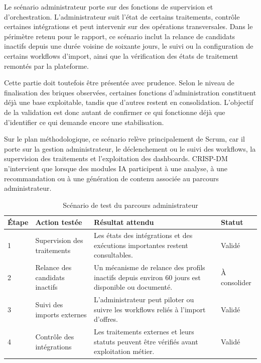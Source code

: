 Le scénario administrateur porte sur des fonctions de supervision et d'orchestration. L'administrateur suit l'état de certains traitements, contrôle certaines intégrations et peut intervenir sur des opérations transversales. Dans le périmètre retenu pour le rapport, ce scénario inclut la relance de candidats inactifs depuis une durée voisine de soixante jours, le suivi ou la configuration de certains workflows d'import, ainsi que la vérification des états de traitement remontés par la plateforme.

Cette partie doit toutefois être présentée avec prudence. Selon le niveau de finalisation des briques observées, certaines fonctions d'administration constituent déjà une base exploitable, tandis que d'autres restent en consolidation. L'objectif de la validation est donc autant de confirmer ce qui fonctionne déjà que d'identifier ce qui demande encore une stabilisation.

Sur le plan méthodologique, ce scénario relève principalement de Scrum, car il porte sur la gestion administrateur, le déclenchement ou le suivi des workflows, la supervision des traitements et l'exploitation des dashboards. CRISP-DM n'intervient que lorsque des modules IA participent à une analyse, à une recommandation ou à une génération de contenu associée au parcours administrateur.

\begin{table}[H]
\centering
\small
\renewcommand{\arraystretch}{1.3}
\begin{tabular}{|p{2.3cm}|p{4.2cm}|p{5.2cm}|p{2.3cm}|}
\hline
\rowcolor{headerblue}
\textbf{Étape} & \textbf{Action testée} & \textbf{Résultat attendu} & \textbf{Statut} \\
\hline
1 & Supervision des traitements & Les états des intégrations et des exécutions importantes restent consultables. & Validé \\
\hline
2 & Relance des candidats inactifs & Un mécanisme de relance des profils inactifs depuis environ 60 jours est disponible ou documenté. & À consolider \\
\hline
3 & Suivi des imports externes & L'administrateur peut piloter ou suivre les workflows reliés à l'import d'offres. & Validé \\
\hline
4 & Contrôle des intégrations & Les traitements externes et leurs statuts peuvent être vérifiés avant exploitation métier. & Validé \\
\hline
\end{tabular}
\normalsize
\caption{Scénario de test du parcours administrateur}
\end{table}

